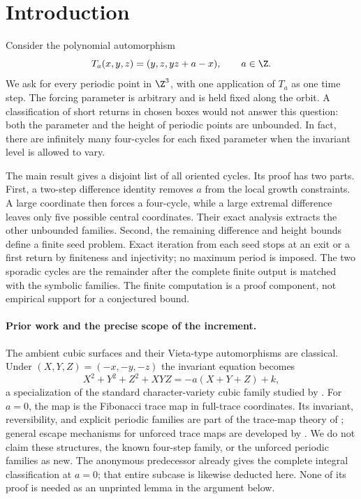 \section{Introduction}
\label{sec:introduction}

Consider the polynomial automorphism
\begin{equation}
 T_a(x,y,z)=(y,z,yz+a-x),\qquad a\in\Z.
 \label{eq:map}
\end{equation}
We ask for every periodic point in $\Z^3$, with one application of
$T_a$ as one time step. The forcing parameter is arbitrary and is
held fixed along the orbit. A classification of short returns in
chosen boxes would not answer this question: both the parameter and
the height of periodic points are unbounded. In fact, there are
infinitely many four-cycles for each fixed parameter when the
invariant level is allowed to vary.

The main result gives a disjoint list of all oriented cycles. Its
proof has two parts. First, a two-step difference identity removes
$a$ from the local growth constraints. A large coordinate then
forces a four-cycle, while a large extremal difference leaves only
five possible central coordinates. Their exact analysis extracts
the other unbounded families. Second, the remaining difference and
height bounds define a finite seed problem. Exact iteration from
each seed stops at an exit or a first return by finiteness and
injectivity; no maximum period is imposed. The two sporadic cycles
are the remainder after the complete finite output is matched with
the symbolic families. The finite computation is a proof component,
not empirical support for a conjectured bound.

\paragraph{Prior work and the precise scope of the increment.}
The ambient cubic surfaces and their Vieta-type automorphisms are
classical. Under $(X,Y,Z)=(-x,-y,-z)$ the invariant equation becomes
\[
 X^2+Y^2+Z^2+XYZ=-a(X+Y+Z)+k,
\]
a specialization of the standard character-variety cubic family
studied by \citet{cantatLoray2009}. For $a=0$, the map is the
Fibonacci trace map in full-trace coordinates. Its invariant,
reversibility, and explicit periodic families are part of the
trace-map theory of \citet{robertsBaake1994}; general escape
mechanisms for unforced trace maps are developed by
\citet{roberts1996}. We do not claim these structures, the known
four-step family, or the unforced periodic families as new.
The anonymous predecessor \citep{priorIntegralTrace} already gives
the complete integral classification at $a=0$; that entire subcase
is likewise deducted here. None of its proof is needed as an
unprinted lemma in the argument below.

